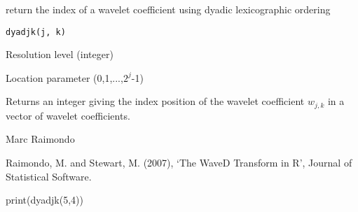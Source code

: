 \documentclass{article}
\begin{document}
\begin{Description}\relax
return the index of a
wavelet coefficient using dyadic lexicographic ordering
\end{Description}
\begin{Usage}
\begin{verbatim}
dyadjk(j, k)
\end{verbatim}
\end{Usage}
\begin{Arguments}
\begin{ldescription}
\item[\code{j}] Resolution level (integer) 
\item[\code{k}] Location parameter (0,1,...,$2^j$-1)
\end{ldescription}
\end{Arguments}
\begin{Value}
Returns an integer giving the index position
of the wavelet coefficient $w_{j,k}$ in a vector of wavelet 
coefficients.
\end{Value}
\begin{Author}\relax
Marc Raimondo
\end{Author}
\begin{References}\relax
Raimondo, M. and Stewart, M. (2007),
`The WaveD Transform in R', Journal of Statistical Software.
\end{References}
\begin{SeeAlso}\relax
{}
\end{SeeAlso}
\begin{Examples}
\begin{ExampleCode}
print(dyadjk(5,4))
  \end{ExampleCode}
\end{Examples}
\end{document}
